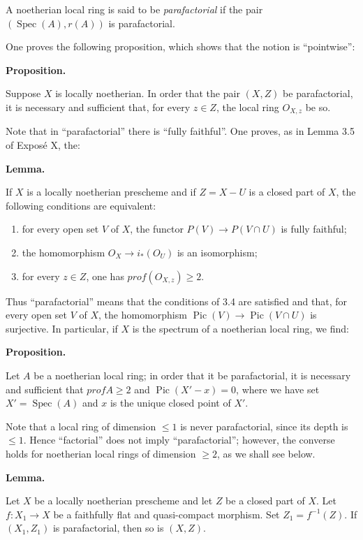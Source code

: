 \documentclass[
]{article}
\providecommand{\tightlist}{%
  \setlength{\itemsep}{0pt}\setlength{\parskip}{0pt}}
\begin{document}
A noetherian local ring is said to be \emph{parafactorial} if the pair
\((\operatorname{Spec}(A), {r(A)})\) is parafactorial.

One proves the following proposition, which shows that the notion is
``pointwise'':

\textbf{Proposition.}

Suppose \(X\) is locally noetherian. In order that the pair \((X, Z)\)
be parafactorial, it is necessary and sufficient that, for every
\(z \in Z\), the local ring \(O_{X,z}\) be so.

Note that in ``parafactorial'' there is ``fully faithful''. One proves,
as in Lemma 3.5 of Exposé X, the:

\textbf{Lemma.}

If \(X\) is a locally noetherian prescheme and if \(Z = X - U\) is a
closed part of \(X\), the following conditions are equivalent:

\begin{enumerate}
\def\labelenumi{\arabic{enumi}.}
\tightlist
\item
  for every open set \(V\) of \(X\), the functor
  \(P(V) \to P(V \cap U)\) is fully faithful;
\item
  the homomorphism \(O_{X} \to i_{*}(O_{U})\) is an isomorphism;
\item
  for every \(z \in Z\), one has \(prof(O_{X,z}) \geqslant 2\).
\end{enumerate}

Thus ``parafactorial'' means that the conditions of 3.4 are satisfied
and that, for every open set \(V\) of \(X\), the homomorphism
\(\operatorname{Pic}(V) \to \operatorname{Pic}(V \cap U)\) is
surjective. In particular, if \(X\) is the spectrum of a noetherian
local ring, we find:

\textbf{Proposition.}

Let \(A\) be a noetherian local ring; in order that it be parafactorial,
it is necessary and sufficient that \(prof A \geqslant 2\) and
\(\operatorname{Pic}(X' - {x}) = 0\), where we have set
\(X' = \operatorname{Spec}(A)\) and \(x\) is the unique closed point of
\(X'\).

Note that a local ring of dimension \(\leqslant 1\) is never
parafactorial, since its depth is \(\leqslant 1\). Hence ``factorial''
does not imply ``parafactorial''; however, the converse holds for
noetherian local rings of dimension \(\geqslant 2\), as we shall see
below.

\textbf{Lemma.}

Let \(X\) be a locally noetherian prescheme and let \(Z\) be a closed
part of \(X\). Let \(f: X_{1} \to X\) be a faithfully flat and
quasi-compact morphism. Set \(Z_{1} = f^{-1}(Z)\). If \((X_{1}, Z_{1})\)
is parafactorial, then so is \((X, Z)\).
\end{document}

